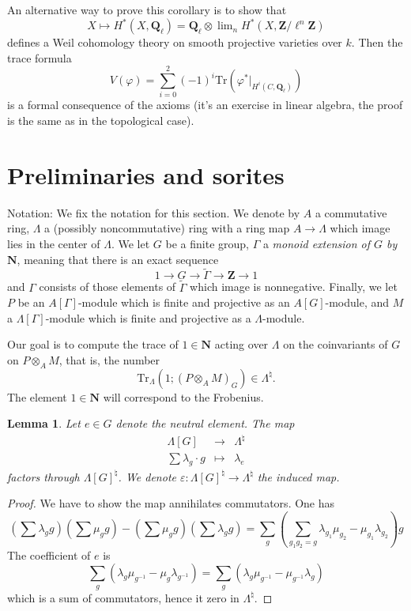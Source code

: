 \documentclass{stacks-project}
\theoremstyle{plain}
\newtheorem{lemma}[subsection]{Lemma}
\theoremstyle{definition}
\theoremstyle{remark}
\numberwithin{equation}{subsection}
\def\lim{\mathop{\mathrm{lim}}\nolimits}
\begin{document}
\noindent
An alternative way to prove this corollary is to show that
$$
X \mapsto H^* (X, \mathbf{Q}_\ell) =
\mathbf{Q}_\ell \otimes
\lim_n H^*(X, \mathbf{Z}/\ell^n\mathbf{Z})
$$
defines a Weil cohomology theory on smooth projective varieties over $k$. Then
the trace formula
$$
V(\varphi) = \sum_{i = 0}^2 (-1)^i
\text{Tr}(\varphi^* |_{H^i(C, \mathbf{Q}_\ell)})
$$
is a formal consequence of the axioms (it's an exercise in linear algebra, the
proof is the same as in the topological case).




\section{Preliminaries and sorites}
\label{section-preliminaries}

\noindent
Notation:
We fix the notation for this section. We denote by $A$ a commutative ring,
$\Lambda$ a (possibly noncommutative) ring with a ring map $A\to \Lambda$ which
image lies in the center of $\Lambda$. We let $G$ be a finite group, $\Gamma$ a
{\it monoid extension of $G$ by $\mathbf{N}$}, meaning that there is an exact
sequence
$$
1\to G\to \tilde\Gamma\to \mathbf{Z}\to 1
$$
and $\Gamma$ consists of those elements of $\tilde\Gamma$ which image is
nonnegative. Finally, we let $P$ be an $A[\Gamma]$-module which is finite and
projective as an $A[G]$-module, and $M$ a $\Lambda[\Gamma]$-module which is
finite and projective as a $\Lambda$-module.

\medskip\noindent
Our goal is to compute the trace of $1 \in \mathbf{N}$ acting over $\Lambda$
on the coinvariants of $G$ on $P \otimes_A M$, that is, the number
$$
\text{Tr}_{\Lambda}\left(1; \left(P \otimes_A M\right)_G\right) \in
\Lambda^\natural.
$$
The element $1\in \mathbf{N}$ will correspond to the Frobenius.

\begin{lemma}
\label{lemma-epsilon}
Let $e\in G$ denote the neutral element. The map
$$
\begin{matrix}
\Lambda[G] & \longrightarrow & \Lambda^{\natural}\\
\sum \lambda_g\cdot g & \longmapsto & \lambda_e
\end{matrix}
$$
factors through $\Lambda[G]^\natural$. We denote
$\varepsilon : \Lambda[G]^\natural\to \Lambda^\natural$ the induced map.
\end{lemma}

\begin{proof}
We have to show the map annihilates commutators. One has
$$
\left(\sum\lambda_g g\right)\left(\sum\mu_g g\right)-\left(\sum \mu_g
g\right)\left(\sum\lambda_g g\right)
= \sum_g\left(\sum_{g_1g_2=g}
\lambda_{g_1}\mu_{g_2}-\mu_{g_1}\lambda_{g_2}\right)g
$$
The coefficient of $e$ is
$$
\sum_g\left(\lambda_g\mu_{g^{-1}}-\mu_g\lambda_{g^{-1}}\right) =
\sum_g\left(\lambda_g\mu_{g^{-1}}-\mu_{g^{-1}}\lambda_g\right)
$$
which is a sum of commutators, hence it zero in $\Lambda^\natural$.
\end{proof}
\end{document}
